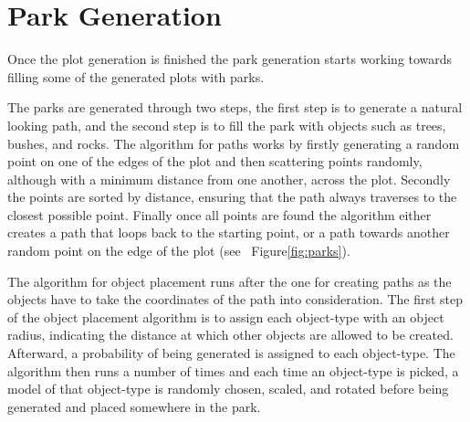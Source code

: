 \section{Park Generation}

Once the plot generation is finished the park generation starts working towards filling some of the generated plots with parks.

The parks are generated through two steps, the first step is to generate a natural looking path, and the second step is to fill the park with objects such as trees, bushes, and rocks. 
The algorithm for paths works by firstly generating a random point on one of the edges of the plot and then scattering points randomly, although with a minimum distance from one another, across the plot. 
Secondly the points are sorted by distance, ensuring that the path always traverses to the closest possible point. 
Finally once all points are found the algorithm either creates a path that loops back to the starting point, or a path towards another random point on the edge of the plot (see ~Figure\ref{fig:parks}).

The algorithm for object placement runs after the one for creating paths as the objects have to take the coordinates of the path into consideration.
The first step of the object placement algorithm is to assign each object-type with an object radius, indicating the distance at which other objects are allowed to be created. 
Afterward, a probability of being generated is assigned to each object-type.
The algorithm then runs a number of times and each time an object-type is picked, a model of that object-type is randomly chosen, scaled, and rotated before being generated and placed somewhere in the park.

